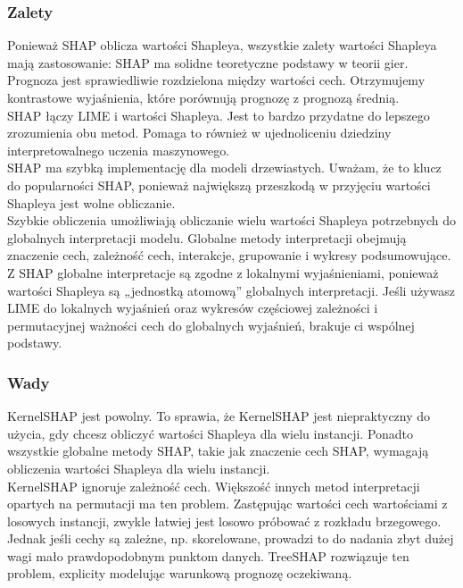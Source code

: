 \subsubsection{Zalety}

Ponieważ SHAP oblicza wartości Shapleya, wszystkie zalety wartości Shapleya mają zastosowanie: SHAP ma solidne teoretyczne podstawy w teorii gier. Prognoza jest sprawiedliwie rozdzielona między wartości cech. Otrzymujemy kontrastowe wyjaśnienia, które porównują prognozę z prognozą średnią. \cite{shap}\\

SHAP łączy LIME i wartości Shapleya. Jest to bardzo przydatne do lepszego zrozumienia obu metod. Pomaga to również w ujednoliceniu dziedziny interpretowalnego uczenia maszynowego. \cite{shap}\\

SHAP ma szybką implementację dla modeli drzewiastych. Uważam, że to klucz do popularności SHAP, ponieważ największą przeszkodą w przyjęciu wartości Shapleya jest wolne obliczanie. \cite{shap}\\

Szybkie obliczenia umożliwiają obliczanie wielu wartości Shapleya potrzebnych do globalnych interpretacji modelu. Globalne metody interpretacji obejmują znaczenie cech, zależność cech, interakcje, grupowanie i wykresy podsumowujące. Z SHAP globalne interpretacje są zgodne z lokalnymi wyjaśnieniami, ponieważ wartości Shapleya są „jednostką atomową” globalnych interpretacji. Jeśli używasz LIME do lokalnych wyjaśnień oraz wykresów częściowej zależności i permutacyjnej ważności cech do globalnych wyjaśnień, brakuje ci wspólnej podstawy. \cite{shap}\\

\subsubsection{Wady}

KernelSHAP jest powolny. To sprawia, że KernelSHAP jest niepraktyczny do użycia, gdy chcesz obliczyć wartości Shapleya dla wielu instancji. Ponadto wszystkie globalne metody SHAP, takie jak znaczenie cech SHAP, wymagają obliczenia wartości Shapleya dla wielu instancji. \cite{shap}\\

KernelSHAP ignoruje zależność cech. Większość innych metod interpretacji opartych na permutacji ma ten problem. Zastępując wartości cech wartościami z losowych instancji, zwykle łatwiej jest losowo próbować z rozkładu brzegowego. Jednak jeśli cechy są zależne, np. skorelowane, prowadzi to do nadania zbyt dużej wagi mało prawdopodobnym punktom danych. TreeSHAP rozwiązuje ten problem, explicity modelując warunkową prognozę oczekiwaną. \cite{shap}\\

